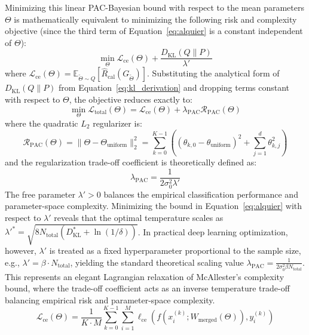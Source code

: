 Minimizing this linear PAC-Bayesian bound with respect to the mean parameters $\Theta$ is mathematically equivalent to minimizing the following risk and complexity objective (since the third term of Equation~\eqref{eq:alquier} is a constant independent of $\Theta$):
\begin{equation}
\min_{\Theta} \mathcal{L}_{\text{ce}}(\Theta) + \frac{D_{\text{KL}}(Q \parallel P)}{\lambda'}
\end{equation}
where $\mathcal{L}_{\text{ce}}(\Theta) = \mathbb{E}_{\tilde{\Theta} \sim Q}[\widehat{R}_{\text{cal}}(G_{\tilde{\Theta}})]$. Substituting the analytical form of $D_{\text{KL}}(Q \parallel P)$ from Equation~\eqref{eq:kl_derivation} and dropping terms constant with respect to $\Theta$, the objective reduces exactly to:
\begin{equation}
\min_{\Theta} \mathcal{L}_{\text{total}}(\Theta) = \mathcal{L}_{\text{ce}}(\Theta) + \lambda_{\text{PAC}} \mathcal{R}_{\text{PAC}}(\Theta)
\end{equation}
where the quadratic $L_2$ regularizer is:
\begin{equation}
\label{eq:pac_regularizer}
\mathcal{R}_{\text{PAC}}(\Theta) = \|\Theta - \Theta_{\text{uniform}}\|_2^2 = \sum_{k=0}^{K-1} \left( (\theta_{k,0} - \theta_{\text{uniform}})^2 + \sum_{j=1}^d \theta_{k,j}^2 \right)
\end{equation}
and the regularization trade-off coefficient is theoretically defined as:
\begin{equation}
\lambda_{\text{PAC}} = \frac{1}{2 \sigma_0^2 \lambda'}
\end{equation}
The free parameter $\lambda' > 0$ balances the empirical classification performance and parameter-space complexity. Minimizing the bound in Equation~\eqref{eq:alquier} with respect to $\lambda'$ reveals that the optimal temperature scales as $\lambda'^* = \sqrt{8 N_{\text{total}} (D_{\text{KL}}^* + \ln(1/\delta))}$. In practical deep learning optimization, however, $\lambda'$ is treated as a fixed hyperparameter proportional to the sample size, e.g., $\lambda' = \beta \cdot N_{\text{total}}$, yielding the standard theoretical scaling value $\lambda_{\text{PAC}} = \frac{1}{2 \sigma_0^2 \beta N_{\text{total}}}$. This represents an elegant Lagrangian relaxation of McAllester's complexity bound, where the trade-off coefficient acts as an inverse temperature trade-off balancing empirical risk and parameter-space complexity.
\begin{equation}
\mathcal{L}_{\text{ce}}(\Theta) = \frac{1}{K \cdot M} \sum_{k=0}^{K-1} \sum_{i=1}^{M} \ell_{\text{ce}}\left(f\left(x_i^{(k)}; W_{\text{merged}}(\Theta)\right), y_i^{(k)}\right)
\end{equation}

